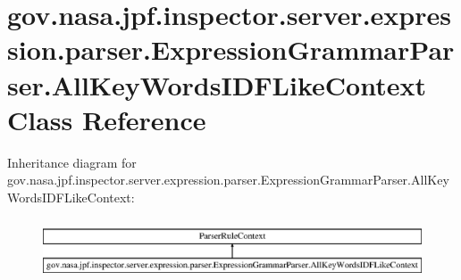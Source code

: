 \hypertarget{classgov_1_1nasa_1_1jpf_1_1inspector_1_1server_1_1expression_1_1parser_1_1_expression_grammar_pad664d42a2aee14226e172b869b9ffb3b}{}\section{gov.\+nasa.\+jpf.\+inspector.\+server.\+expression.\+parser.\+Expression\+Grammar\+Parser.\+All\+Key\+Words\+I\+D\+F\+Like\+Context Class Reference}
\label{classgov_1_1nasa_1_1jpf_1_1inspector_1_1server_1_1expression_1_1parser_1_1_expression_grammar_pad664d42a2aee14226e172b869b9ffb3b}
Inheritance diagram for gov.\+nasa.\+jpf.\+inspector.\+server.\+expression.\+parser.\+Expression\+Grammar\+Parser.\+All\+Key\+Words\+I\+D\+F\+Like\+Context\+:\begin{figure}[H]
\begin{center}
\leavevmode
\includegraphics[height=1.836066cm]{classgov_1_1nasa_1_1jpf_1_1inspector_1_1server_1_1expression_1_1parser_1_1_expression_grammar_pad664d42a2aee14226e172b869b9ffb3b}
\end{center}
\end{figure}
